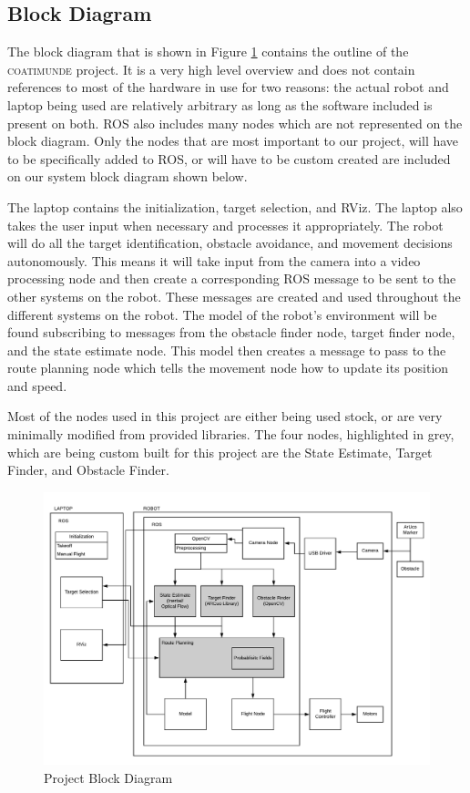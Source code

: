 \documentclass{article}
\begin{document}
	\subsection{Block Diagram}
	
	The block diagram that is shown in Figure \ref{fig:blockdiagram} contains the outline of the \textsc{coatimunde} project. It is a very high level overview and does not contain references to most of the hardware in use for two reasons: the actual robot and laptop being used are relatively arbitrary as long as the software included is present on both. ROS also includes many nodes which are not represented on the block diagram. Only the nodes that are most important to our project, will have to be specifically added to ROS, or will have to be custom created are included on our system block diagram shown below.
	
	The laptop contains the initialization, target selection, and RViz. The laptop also takes the user input when necessary and processes it appropriately.  The robot will do all the target identification, obstacle avoidance, and movement decisions autonomously. This means it will take input from the camera into a video processing node and then create a corresponding ROS message to be sent to the other systems on the robot. These messages are created and used throughout the different systems on the robot. The model of the robot's environment will be found subscribing to messages from the obstacle finder node, target finder node, and the state estimate node. This model then creates a message to pass to the route planning node which tells the movement node how to update its position and speed. 
	
	Most of the nodes used in this project are either being used stock, or are very minimally modified from provided libraries. The four nodes, highlighted in grey, which are being custom built for this project are the State Estimate, Target Finder, and Obstacle Finder. 

	\begin{figure}[H]
		\centering
		\includegraphics[width=\linewidth]{BlockDiagram}
		\caption{Project Block Diagram}
		\label{fig:blockdiagram}
	\end{figure}
\end{document}
